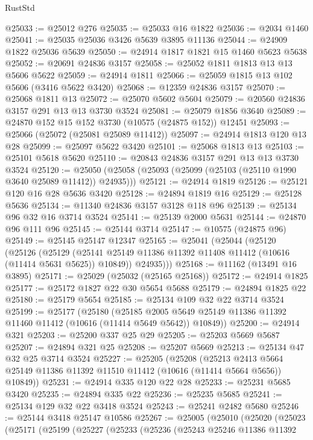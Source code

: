 \begin{lexlean}{RustStd}
\begin{coremodule}
@25033 := @25012 @276
@25035 := @25033 @16 @1822
@25036 := @2034 @1460
@25041 := @25035 @25036 @3426 @5639 @3895 @11136
@25044 := @24909 @1822 @25036 @5639
@25050 := @24914 @1817 @1821 @15 @1460 @5623 @5638
@25052 := @20691 @24836 @3157
@25058 := @25052 @1811 @1813 @13 @13 @5606 @5622
@25059 := @24914 @1811
@25066 := @25059 @1815 @13 @102 @5606 (@3416 @5622 @3420)
@25068 := @12359 @24836 @3157
@25070 := @25068 @1811 @13
@25072 := @25070 @5602 @5604
@25079 := @20560 @24836 @3157 @291 @13 @13 @3730 @3524
@25081 := @25079 @1856 @3640
@25089 := @24870 @152 @15 @152 @3730 (@10575 (@24875 @152)) @12451
@25093 := @25066 (@25072 (@25081 @25089 @11412))
@25097 := @24914 @1813 @120 @13 @28
@25099 := @25097 @5622 @3420
@25101 := @25068 @1813 @13
@25103 := @25101 @5618 @5620
@25110 := @20843 @24836 @3157 @291 @13 @13 @3730 @3524
@25120 := @25050 (@25058 (@25093 (@25099 (@25103 (@25110 @1990 @3640 @25089 @11412)) @24935)))
@25121 := @24914 @1819
@25126 := @25121 @120 @16 @28 @5636 @3420
@25128 := @24894 @1819 @16
@25129 := @25128 @5636
@25134 := @11340 @24836 @3157 @3128 @118 @96
@25139 := @25134 @96 @32 @16 @3714 @3524
@25141 := @25139 @2000 @5631
@25144 := @24870 @96 @111 @96
@25145 := @25144 @3714
@25147 := @10575 (@24875 @96)
@25149 := @25145 @25147 @12347
@25165 := @25041
    (@25044
      (@25120
        (@25126
          (@25129 (@25141 @25149 @11386 @11392 @11408 @11412 (@10616 (@11414 @5631 @5625)) @10849))
          @24935)))
@25168 := @11162 (@13491 @16 @3895)
@25171 := @25029 (@25032 (@25165 @25168))
@25172 := @24914 @1825
@25177 := @25172 @1827 @22 @30 @5654 @5688
@25179 := @24894 @1825 @22
@25180 := @25179 @5654
@25185 := @25134 @109 @32 @22 @3714 @3524
@25199 := @25177
    (@25180
      (@25185 @2005 @5649 @25149 @11386 @11392 @11460 @11412 (@10616 (@11414 @5649 @5642)) @10849))
@25200 := @24914 @321
@25203 := @25200 @337 @25 @29
@25205 := @25203 @5669 @5687
@25207 := @24894 @321 @25
@25208 := @25207 @5669
@25213 := @25134 @47 @32 @25 @3714 @3524
@25227 := @25205
    (@25208
      (@25213 @2413 @5664 @25149 @11386 @11392 @11510 @11412 (@10616 (@11414 @5664 @5656)) @10849))
@25231 := @24914 @335 @120 @22 @28
@25233 := @25231 @5685 @3420
@25235 := @24894 @335 @22
@25236 := @25235 @5685
@25241 := @25134 @129 @32 @22 @3418 @3524
@25243 := @25241 @2482 @5680
@25246 := @25144 @3418 @25147 @10586
@25267 := @25005
    (@25010
      (@25020
        (@25023
          (@25171
            (@25199
              (@25227
                (@25233
                  (@25236
                    (@25243
                      @25246
                      @11386
                      @11392

\end{coremodule}
\end{lexlean}
